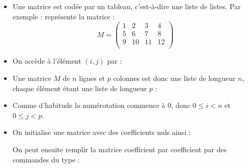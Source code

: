\documentclass[11pt,class=report,crop=false]{standalone}
\begin{document}
\begin{cours}
\sauteligne	
	\begin{itemize}
		\item Une matrice est codée par un tableau, c'est-à-dire une liste de listes.
		Par exemple :		
		représente la matrice :
		$$M = \begin{pmatrix}
		1&2&3&4\\5&6&7&8\\9&10&11&12\\
		\end{pmatrix}$$
		
		\item On accède à l'élément $(i,j)$ par :		
		
		
		\item Une matrice $M$ de $n$ lignes et $p$ colonnes est donc une liste de longueur $n$, chaque élément étant une liste de longueur $p$ :		
		
		\item Comme d'habitude la numérotation commence à $0$, donc $0 \le i < n$ et $0 \le j < p$.
		
		\item On initialise une matrice avec des coefficients nuls ainsi :		
		
		On peut ensuite remplir la matrice coefficient par coefficient par des commandes du type :		
	\end{itemize}

\end{cours}

\end{document}
